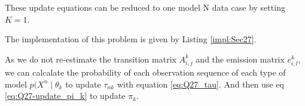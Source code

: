 \documentclass[12pt]{article}
\newenvironment{problem}[2][Problem]{\begin{trivlist}
\item[\hskip \labelsep {\bfseries #1}\hskip \labelsep {\bfseries #2.}]}{\end{trivlist}}
\begin{document}
\begin{problem}{2.7.21}
These update equations can be reduced to one model N data case by setting $K = 1$.
\end{problem}

\begin{problem}{2.7.22}
The implementation of this problem is given by Listing \ref{impl:Sec27}.

As we do not re-estimate the transition matrix $A^{k}_{i,j}$ and the emission
matrix $e^{k}_{i,l}$, we can calcalate the probability of each observation sequence of 
each type of model $p(X^n \mid \theta_k$ to update $\tau_{nk}$ with equation
\eqref{eq:Q27_tau}. And then use eq \eqref{eq:Q27-update_pi_k} to update $\pi_k$.
\end{problem}

\begin{problem}{2.7.23}
    
\end{problem}
\pagebreak
\end{document}
